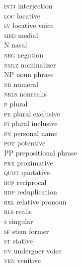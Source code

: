 \begin{multicols}{2}
\begin{tabbing}
\textsc{intj}   \>  interjection     \\
\textsc{loc}    \>  locative         \\
\textsc{lv}     \>  locative voice   \\
\textsc{med}    \>  medial           \\
 N              \>  nasal                      \\
\textsc{neg}   \>  negation         \\
\textsc{nmlz}  \>  {nominalizer}          \\
NP             \>  {noun phrase}          \\
\textsc{nr}    \>  numeral   \\
\textsc{nrls}  \>  nonrealis \\
\textsc{p}     \>  plural    \\
\textsc{pe}    \>  {plural exclusive}     \\
\textsc{pi}    \>  {plural inclusive}     \\
\textsc{pn}    \>  {personal name}        \\
\textsc{pot}   \>  {potentive}            \\
PP             \>  {prepositional phrase} \\
\textsc{prx}   \>  {proximative}          \\
\textsc{quot}  \>  {quotative}            \\
\textsc{rcp}   \>  {reciprocal}           \\
\textsc{rdp}   \>  {reduplication}        \\
\textsc{rel}   \>  {relative pronoun}     \\
\textsc{rls}   \>  realis   \\
\textsc{s}     \>  singular \\
\textsc{sf}    \>  {stem former}  \\
\textsc{st}    \>  stative   \\
\textsc{uv}    \>  {undergoer voice} \\
\textsc{ven}   \>  venitive                     
\end{tabbing}
\end{multicols}


